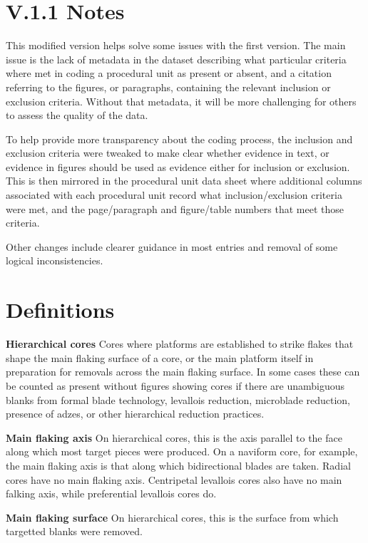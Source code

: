 \documentclass[
]{article}
\begin{document}
\hypertarget{v.1.1-notes}{%
\section{V.1.1 Notes}\label{v.1.1-notes}}

This modified version helps solve some issues with the first version.
The main issue is the lack of metadata in the dataset describing what
particular criteria where met in coding a procedural unit as present or
absent, and a citation referring to the figures, or paragraphs,
containing the relevant inclusion or exclusion criteria. Without that
metadata, it will be more challenging for others to assess the quality
of the data.

To help provide more transparency about the coding process, the
inclusion and exclusion criteria were tweaked to make clear whether
evidence in text, or evidence in figures should be used as evidence
either for inclusion or exclusion. This is then mirrored in the
procedural unit data sheet where additional columns associated with each
procedural unit record what inclusion/exclusion criteria were met, and
the page/paragraph and figure/table numbers that meet those criteria.

Other changes include clearer guidance in most entries and removal of
some logical inconsistencies.

\hypertarget{definitions}{%
\section{Definitions}\label{definitions}}

\textbf{Hierarchical cores} Cores where platforms are established to
strike flakes that shape the main flaking surface of a core, or the main
platform itself in preparation for removals across the main flaking
surface. In some cases these can be counted as present without figures
showing cores if there are unambiguous blanks from formal blade
technology, levallois reduction, microblade reduction, presence of
adzes, or other hierarchical reduction practices.

\textbf{Main flaking axis} On hierarchical cores, this is the axis
parallel to the face along which most target pieces were produced. On a
naviform core, for example, the main flaking axis is that along which
bidirectional blades are taken. Radial cores have no main flaking axis.
Centripetal levallois cores also have no main falking axis, while
preferential levallois cores do.

\textbf{Main flaking surface} On hierarchical cores, this is the surface
from which targetted blanks were removed.
\end{document}
